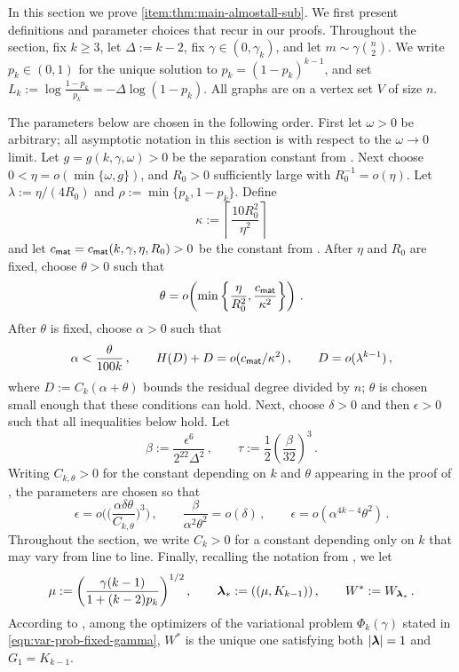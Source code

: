 In this section we prove  \ref{item:thm:main-almostall-sub}. We first present definitions and parameter choices that recur in our proofs. Throughout the section, fix $k\geq3$, let $\Delta:=k-2$, fix $\gamma\in(0,\gamma_k)$, and let $m\sim\gamma\binom{n}{2}$. We write $p_k\in(0,1)$ for the unique solution to $p_k=(1-p_k)^{k-1}$, and set $L_k:=\log\frac{1-p_k}{p_k}=-\Delta\log(1-p_k)$. All graphs are on a vertex set $V$ of size $n$.

The parameters below are chosen in the following order. First let $\omega>0$ be arbitrary; all asymptotic notation in this section is with respect to the $\omega\to0$ limit. Let $g=g(k,\gamma,\omega)>0$ be the separation constant from . Next choose $0<\eta=o(\min\{\omega,g\})$, and $R_0>0$ sufficiently large with $R_0^{-1}=o(\eta)$. Let $\lambda:=\eta/(4R_0)$ and $\rho:=\min\{p_k,1-p_k\}$. Define
$$\kappa:=\left\lceil\frac{10R_0^2}{\eta^2}\right\rceil$$
and let $c_{\mathsf{mat}}=c_{\mathsf{mat}}(k,\gamma,\eta,R_0)>0$ be the constant from . After $\eta$ and $R_0$ are fixed, choose $\theta>0$ such that
\begin{equation}\label{eqn:sub-theta-parameter-condition-K1k}
\theta=o\!\left(\min\left\{\frac{\eta}{R_0^2},\frac{c_{\mathsf{mat}}}{\kappa^2}\right\}\right)\,.
\end{equation}
After $\theta$ is fixed, choose $\alpha>0$ such that
\begin{equation}\label{eqn:sub-matching-parameter-condition-K1k}
\alpha<\frac{\theta}{100k}\,,\qquad H(D)+D=o(c_{\mathsf{mat}}/\kappa^2)\,,\qquad D=o(\lambda^{k-1})\,,
\end{equation}
where $D:=C_k(\alpha+\theta)$ bounds the residual degree divided by $n$; $\theta$ is chosen small enough that these conditions can hold. Next, choose $\delta>0$ and then $\epsilon>0$ such that all inequalities below hold. Let
$$\beta:=\frac{\epsilon^6}{2^{22}\Delta^2}\,,\qquad\tau:=\frac{1}{2}\left(\frac{\beta}{32}\right)^3\,.$$
Writing $C_{k,\theta}>0$ for the constant depending on $k$ and $\theta$ appearing in the proof of , the parameters are chosen so that
\begin{equation}\label{eqn:sub-smaller-components-params}
\epsilon=o\bigg(\bigg(\frac{\alpha\delta\theta}{C_{k,\theta}}\bigg)^3\bigg)\,,\qquad \frac{\beta}{\alpha^2\theta^2}=o(\delta)\,,\qquad \epsilon=o(\alpha^{4k-4}\theta^2)\,.
\end{equation}
Throughout the section, we write $C_k>0$ for a constant depending only on $k$ that may vary from line to line.
Finally, recalling the notation from , we let
$$\mu:=\left(\frac{\gamma(k-1)}{1+(k-2)p_k}\right)^{1/2},\qquad {\boldsymbol{\lambda}}_\ast:=((\mu,K_{k-1}))\,,\qquad W^\ast:=W_{{\boldsymbol{\lambda}}_\ast}\,.$$
According to , among the optimizers of the variational problem $\Phi_k(\gamma)$ stated in \eqref{eqn:var-prob-fixed-gamma}, $W^\ast$ is the unique one satisfying both $\lvert{\boldsymbol{\lambda}}\rvert=1$ and $G_1=K_{k-1}$.

